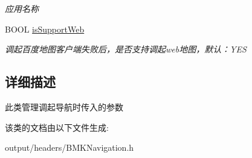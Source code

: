 \begin{DoxyCompactItemize}
\begin{DoxyCompactList}\small\item\em 应用名称 \end{DoxyCompactList}\item 
\hypertarget{interface_b_m_k_navi_para_a6c6138ab343647778afd21a6fb42c685}{}B\+O\+O\+L \hyperlink{interface_b_m_k_navi_para_a6c6138ab343647778afd21a6fb42c685}{is\+Support\+Web}\label{interface_b_m_k_navi_para_a6c6138ab343647778afd21a6fb42c685}

\begin{DoxyCompactList}\small\item\em 调起百度地图客户端失败后，是否支持调起web地图，默认：\+Y\+E\+S \end{DoxyCompactList}\end{DoxyCompactItemize}


\subsection{详细描述}
此类管理调起导航时传入的参数 

该类的文档由以下文件生成\+:\begin{DoxyCompactItemize}
\item 
output/headers/B\+M\+K\+Navigation.\+h\end{DoxyCompactItemize}
